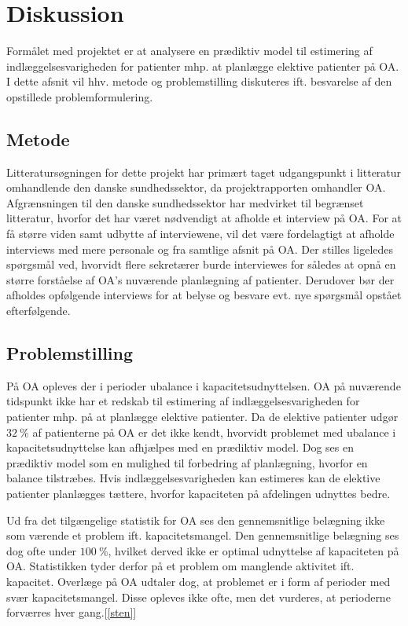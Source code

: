 \section{Diskussion} \label{diskussion}
Formålet med projektet er at analysere en prædiktiv model til estimering af indlæggelsesvarigheden for patienter mhp. at planlægge elektive patienter på OA. I dette afsnit vil hhv. metode og problemstilling diskuteres ift. besvarelse af den opstillede problemformulering. \\


\subsection{Metode}
Litteratursøgningen for dette projekt har primært taget udgangspunkt i litteratur omhandlende den danske sundhedssektor, da projektrapporten omhandler OA. Afgrænsningen til den danske sundhedssektor har medvirket til begrænset litteratur, hvorfor det har været nødvendigt at afholde et interview på OA. 
For at få større viden samt udbytte af interviewene, vil det være fordelagtigt at afholde interviews med mere personale og fra samtlige afsnit på OA. Der stilles ligeledes spørgsmål ved, hvorvidt flere sekretærer burde interviewes for således at opnå en større forståelse af OA's nuværende planlægning af patienter. Derudover bør der afholdes opfølgende interviews for at belyse og besvare evt. nye spørgsmål opstået efterfølgende. 


\subsection{Problemstilling}
På OA opleves der i perioder ubalance i kapacitetsudnyttelsen. OA på nuværende tidspunkt ikke har et redskab til estimering af indlæggelsesvarigheden for patienter mhp. på at planlægge elektive patienter. Da de elektive patienter udgør $32~ \%$ af patienterne på OA er det ikke kendt, hvorvidt problemet med ubalance i kapacitetsudnyttelse kan afhjælpes med en prædiktiv model. Dog ses en prædiktiv model som en mulighed til forbedring af planlægning, hvorfor en balance tilstræbes. Hvis indlæggelsesvarigheden kan estimeres kan de elektive patienter planlægges tættere, hvorfor kapaciteten på afdelingen udnyttes bedre. 


Ud fra det tilgængelige statistik for OA ses den gennemsnitlige belægning ikke som værende et problem ift. kapacitetsmangel. Den gennemsnitlige belægning ses dog ofte under $100~\%$, hvilket derved ikke er optimal udnyttelse af kapaciteten på OA. Statistikken tyder derfor på et problem om manglende aktivitet ift. kapacitet. Overlæge på OA udtaler dog, at problemet er i form af perioder med svær kapacitetsmangel. Disse opleves ikke ofte, men det vurderes, at perioderne forværres hver gang.[\ref{sten}] 


